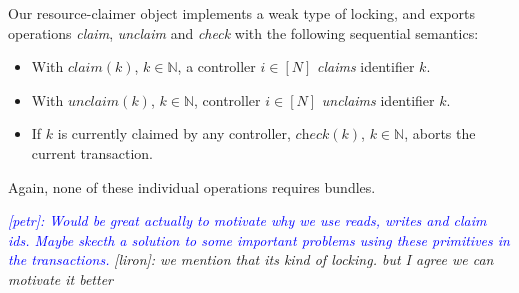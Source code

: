 \documentclass[conference]{sigcomm-alternate}
\newcommand{\Nat}{\mathbb{N}}
\newcommand{\claimcheck}{check\xspace}
\newcommand{\liron}[1]{\textit{\textcolor{mygreen}{[liron]: #1}}} %
\newcommand{\petr}[1]{\textit{\textcolor{blue}{[petr]: #1}}} %
\begin{document}
Our resource-claimer object implements a weak type of locking, and exports operations \emph{claim},
\emph{unclaim} and \emph{\claimcheck} with the following sequential
semantics:

\begin{itemize}
\item With $\textit{claim}(k)$,
  $k\in\Nat$, a controller $i\in[N]$ \emph{claims}
  identifier $k$.

\item With $\textit{unclaim}(k)$, $k\in\Nat$, controller $i\in[N]$
  \emph{unclaims} identifier $k$.

\item If $k$ is currently claimed by any controller,
$\textit{\claimcheck}(k)$, $k\in\Nat$,
aborts the current transaction.

\end{itemize}

Again, none of these individual operations
requires bundles. 

\petr{Would be great actually to motivate why we use reads, writes and claim ids. Maybe skecth a solution to some important problems using these primitives in the transactions.} \liron{we mention that its kind of locking. but I agree we can motivate it better}
\end{document}
